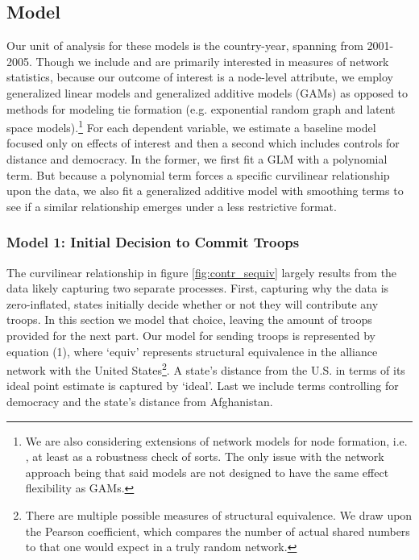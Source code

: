 \documentclass[12pt,letterpaper]{article}
\begin{document}
	\subsection{Model}
		Our unit of analysis for these models is the country-year, spanning from 2001-2005. Though we include and are primarily interested in measures of network statistics, because our outcome of interest is a node-level attribute, we employ generalized linear models and generalized additive models (GAMs) as opposed to methods for modeling tie formation (e.g. exponential random graph and latent space models).\footnote{We are also considering extensions of network models for node formation, i.e. \citet{fosdick_testingmodelingdependencies_2015}, at least as a robustness check of sorts. The only issue with the network approach being that said models are not designed to have the same effect flexibility as GAMs.} For each dependent variable, we estimate a baseline model focused only on effects of interest and then a second which includes controls for distance and democracy. In the former, we first fit a GLM with a polynomial term. But because a polynomial term forces a specific curvilinear relationship upon the data, we also fit a generalized additive model with smoothing terms to see if a similar relationship emerges under a less restrictive format.

		\subsubsection{Model 1: Initial Decision to Commit Troops}
			The curvilinear relationship in figure \ref{fig:contr_sequiv} largely results from the data likely capturing two separate processes. First, capturing why the data is zero-inflated, states initially decide whether or not they will contribute any troops. In this section we model that choice, leaving the amount of troops provided for the next part. Our model for sending troops is represented by equation (1), where `equiv' represents structural equivalence in the alliance network with the United States\footnote{There are multiple possible measures of structural equivalence. We draw upon the Pearson coefficient, which compares the number of actual shared numbers to that one would expect in a truly random network.}. A state's distance from the U.S. in terms of its ideal point estimate is captured by `ideal'. \citep{bailey_twodimensionalanalysisseventy_2018} Last we include terms controlling for democracy and the state's distance from Afghanistan.
\end{document}
